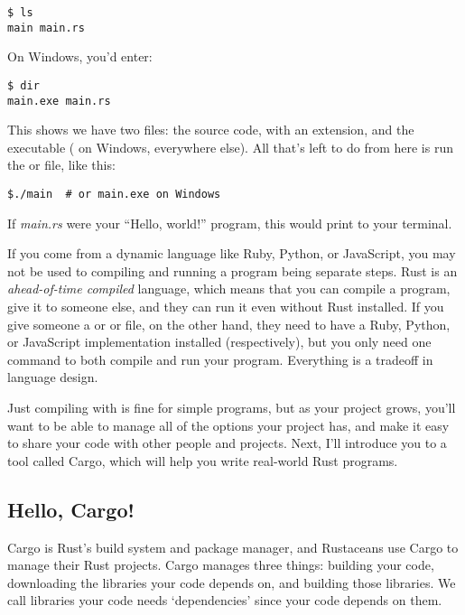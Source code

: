 \begin{verbatim}
$ ls
main main.rs 
\end{verbatim}

On Windows, you'd enter:

\begin{verbatim}
$ dir
main.exe main.rs  
\end{verbatim}

This shows we have two files: the source code, with an  extension, and the executable ( on Windows, 
 everywhere else). All that's left to do from here is run the  or  file, like this:

\begin{verbatim}
$./main  # or main.exe on Windows  
\end{verbatim}

If \emph{main.rs} were your \enquote{Hello, world!} program, this would print  to your terminal.

\blank

If you come from a dynamic language like Ruby, Python, or JavaScript, you may not be used to compiling and running a program 
being separate steps. Rust is an \emph{ahead-of-time compiled} language, which means that you can compile a program, give it 
to someone else, and they can run it even without Rust installed. If you give someone a  or  or  
file, on the other hand, they need to have a Ruby, Python, or JavaScript implementation installed (respectively), but you only 
need one command to both compile and run your program. Everything is a tradeoff in language design.

\blank

Just compiling with  is fine for simple programs, but as your project grows, you'll want to be able to manage all 
of the options your project has, and make it easy to share your code with other people and projects. Next, I'll introduce you 
to a tool called Cargo, which will help you write real-world Rust programs.

\subsection{Hello, Cargo!}

Cargo is Rust’s build system and package manager, and Rustaceans use Cargo to manage their Rust projects. Cargo manages 
three things: building your code, downloading the libraries your code depends on, and building those libraries. We call 
libraries your code needs ‘dependencies’ since your code depends on them.

